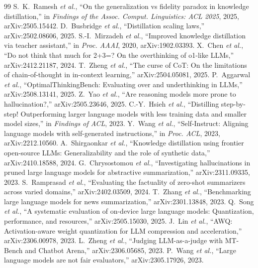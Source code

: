 \documentclass[10pt,journal]{IEEEtran}
\begin{document}
\begin{thebibliography}{99}
 S.~K.~Ramesh \emph{et al.}, ``On the generalization vs fidelity paradox in knowledge distillation,'' in \emph{Findings of the Assoc. Comput. Linguistics: ACL 2025}, 2025, arXiv:2505.15442.
 D.~Busbridge \emph{et al.}, ``Distillation scaling laws,'' arXiv:2502.08606, 2025.
 S.-I.~Mirzadeh \emph{et al.}, ``Improved knowledge distillation via teacher assistant,'' in \emph{Proc. AAAI}, 2020, arXiv:1902.03393.
 X.~Chen \emph{et al.}, ``Do not think that much for 2+3=? On the overthinking of o1-like LLMs,'' arXiv:2412.21187, 2024.
 T.~Zheng \emph{et al.}, ``The curse of CoT: On the limitations of chain-of-thought in in-context learning,'' arXiv:2504.05081, 2025.
 P.~Aggarwal \emph{et al.}, ``OptimalThinkingBench: Evaluating over and underthinking in LLMs,'' arXiv:2508.13141, 2025.
 Z.~Yao \emph{et al.}, ``Are reasoning models more prone to hallucination?,'' arXiv:2505.23646, 2025.
 C.-Y.~Hsieh \emph{et al.}, ``Distilling step-by-step! Outperforming larger language models with less training data and smaller model sizes,'' in \emph{Findings of ACL}, 2023.
 Y.~Wang \emph{et al.}, ``Self-Instruct: Aligning language models with self-generated instructions,'' in \emph{Proc. ACL}, 2023, arXiv:2212.10560.
 A.~Shirgaonkar \emph{et al.}, ``Knowledge distillation using frontier open-source LLMs: Generalizability and the role of synthetic data,'' arXiv:2410.18588, 2024.
 G.~Chrysostomou \emph{et al.}, ``Investigating hallucinations in pruned large language models for abstractive summarization,'' arXiv:2311.09335, 2023.
 S.~Ramprasad \emph{et al.}, ``Evaluating the factuality of zero-shot summarizers across varied domains,'' arXiv:2402.03509, 2024.
 T.~Zhang \emph{et al.}, ``Benchmarking large language models for news summarization,'' arXiv:2301.13848, 2023.
 Q.~Song \emph{et al.}, ``A systematic evaluation of on-device large language models: Quantization, performance, and resources,'' arXiv:2505.15030, 2025.
 J.~Lin \emph{et al.}, ``AWQ: Activation-aware weight quantization for LLM compression and acceleration,'' arXiv:2306.00978, 2023.
 L.~Zheng \emph{et al.}, ``Judging LLM-as-a-judge with MT-Bench and Chatbot Arena,'' arXiv:2306.05685, 2023.
 P.~Wang \emph{et al.}, ``Large language models are not fair evaluators,'' arXiv:2305.17926, 2023.

\end{thebibliography}
\end{document}
